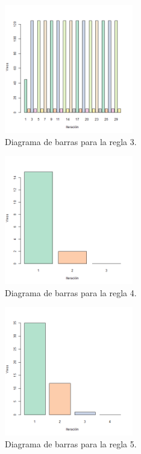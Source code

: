 \documentclass[12pt]{amsart}
\begin{document}
{\begin{figure}[h]
    \centering
    \includegraphics[width=0.5\textwidth]{regla3.png}
    \caption{\label{fig3} Diagrama de barras para la regla 3.}
    \label{fig:figura3}
\end{figure}
\bigskip
\bigskip
\bigskip

\begin{figure}[h!]
    \centering
    \includegraphics[width=0.5\textwidth]{regla4.png}
    \caption{\label{fig4} Diagrama de barras para la regla 4.}
    \label{fig:figura4}
\end{figure}
\bigskip

\begin{figure}[h!]
    \centering
    \includegraphics[width=0.5\textwidth]{regla5.png}
    \caption{\label{fig5} Diagrama de barras para la regla 5.}
    \label{fig:figura5}
\end{figure}
}
\newpage




\bigskip
\end{document}
